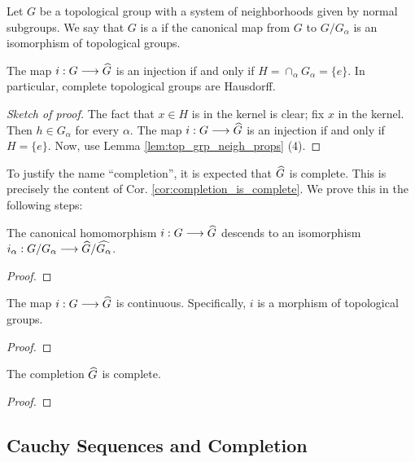 \begin{defn}
Let $G$ be a topological group with a system of neighborhoods
given by normal subgroups. We say that $G$ is a  if the canonical
map from $G$ to $G/G_\alpha$ is an isomorphism of topological
groups.
\end{defn}

\begin{prop}
The map $i: G \longrightarrow \widehat{G}$ is an injection if and only if
$H = \cap_\alpha G_\alpha = \{e\}$. In particular, complete 
topological groups are Hausdorff.
\end{prop}
\begin{proof}[Sketch of proof]
The fact that $x \in H$ is in the kernel is clear; fix $x$ in
the kernel. Then $h \in G_\alpha$ for every $\alpha$. The map $i: 
G \longrightarrow \widehat{G}$ is an injection if and only if $H = \{e\}$. 
Now, use Lemma \ref{lem:top_grp_neigh_props} (4).
\end{proof}

To justify the name ``completion'', it is expected that 
$\widehat{G}$ is complete. This is precisely the content of Cor. 
\ref{cor:completion_is_complete}. We prove this in the following 
steps:

\begin{prop}
The canonical homomorphism $i: G \longrightarrow \widehat{G}$ descends to an 
isomorphism $i_\alpha: G/G_\alpha \longrightarrow 
\widehat{G}/\widehat{G_\alpha}$.
\end{prop}
\begin{proof}

\end{proof}

\begin{prop}\label{prop:compl_is_morph_of_top_grps}
The map $i:G \longrightarrow \widehat{G}$ is continuous. Specifically, $i$
is a morphism of topological groups.
\end{prop}
\begin{proof}

\end{proof}

\begin{cor}\label{cor:completion_is_complete}
The completion $\widehat{G}$ is complete.
\end{cor}
\begin{proof}

\end{proof}

\subsection{Cauchy Sequences and Completion}

